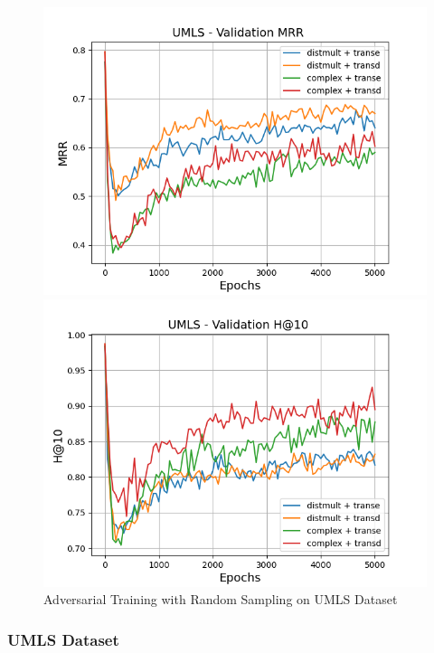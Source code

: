 \begin{figure}
\begin{minipage}{.5\textwidth}
      \centering
      \includegraphics[width=0.9\linewidth]{figures/results/gan_train/pretrained/random/umls/gan_train_random_umls_mrrs.png}
    \end{minipage}%
    \begin{minipage}{.5\textwidth}
      \centering
      \includegraphics[width=0.9\linewidth]{figures/results/gan_train/pretrained/random/umls/gan_train_random_umls_hit10s.png}
    \end{minipage}%
    \caption{Adversarial Training with Random Sampling on \textsc{UMLS} Dataset}
    \label{fig:test}
\end{figure}

\subsubsection{UMLS Dataset}

